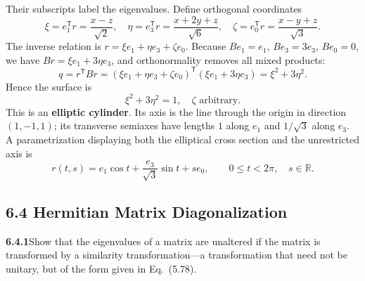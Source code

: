 Their subscripts label the eigenvalues. Define orthogonal coordinates
\[
\xi=e_1^{\mathsf T}r=\frac{x-z}{\sqrt2},\quad
\eta=e_3^{\mathsf T}r=\frac{x+2y+z}{\sqrt6},\quad
\zeta=e_0^{\mathsf T}r=\frac{x-y+z}{\sqrt3}.
\]
The inverse relation is $r=\xi e_1+\eta e_3+\zeta e_0$. Because
$Be_1=e_1$, $Be_3=3e_3$, $Be_0=0$, we have $Br=\xi e_1+3\eta e_3$, and
orthonormality removes all mixed products:
\[
q=r^{\mathsf T}Br
=(\xi e_1+\eta e_3+\zeta e_0)^{\mathsf T}(\xi e_1+3\eta e_3)
=\xi^2+3\eta^2.
\]
Hence the surface is
\[
\boxed{\xi^2+3\eta^2=1,\quad\zeta\text{ arbitrary}.}
\]
This is an \textbf{elliptic cylinder}. Its axis is the line through the
origin in direction $(1,-1,1)$; its transverse semiaxes have lengths
$1$ along $e_1$ and $1/\sqrt3$ along $e_3$. A parametrization displaying
both the elliptical cross section and the unrestricted axis is
\[
r(t,s)=e_1\cos t+\frac{e_3}{\sqrt3}\sin t+s e_0,
\qquad0\le t<2\pi,\quad s\in\mathbb R.
\]

\subsection*{6.4 Hermitian Matrix Diagonalization}

\par\bigskip
\noindent\textbf{6.4.1}\quad Show that the eigenvalues of a matrix are
unaltered if the matrix is transformed by a similarity transformation---a
transformation that need not be unitary, but of the form given in Eq.~(5.78).

